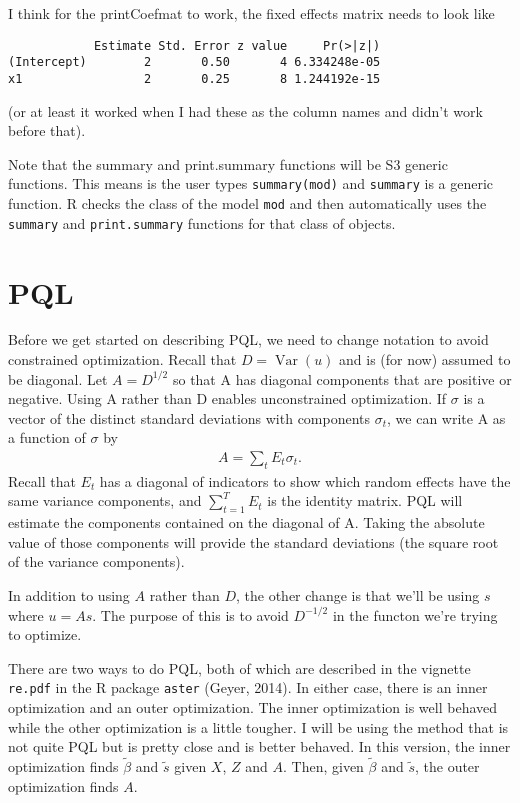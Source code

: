 \documentclass{article}
\DeclareMathOperator{\var}{Var}
\begin{document}
I think for the printCoefmat to work, the fixed effects matrix needs to look like
\begin{verbatim}
            Estimate Std. Error z value     Pr(>|z|)
(Intercept)        2       0.50       4 6.334248e-05
x1                 2       0.25       8 1.244192e-15
\end{verbatim}
(or at least it worked when I had these as the column names and didn't work before that).

Note that the summary and print.summary functions will be S3 generic functions.  This means is the user  types \texttt{summary(mod)} and \texttt{summary} is a generic function. R checks the class of the model \texttt{mod} and then automatically uses the \texttt{summary} and \texttt{print.summary} functions for that class of objects. 




\section{PQL}\label{sec:pql}
 Before we get started on describing PQL, we need to change notation to avoid constrained optimization.  Recall that $D=\var(u)$ and is (for now) assumed to be diagonal. Let $A=D^{1/2}$ so that A has diagonal components that are positive or negative. Using A rather than D enables unconstrained optimization.  If $\sigma$ is a vector of the distinct standard deviations with components $\sigma_t$, we can write A as a function of $\sigma$ by
\begin{align*}
A= \sum_t E_t \sigma_t.
\end{align*}
Recall that $E_t$ has a diagonal of indicators to show which random effects have the same variance components, and $\sum_{t=1}^T E_t$ is the identity matrix. PQL will estimate the components contained on the diagonal of A. Taking the absolute value of those components will provide the standard deviations (the square root of the variance components).

In addition to using $A$ rather than $D$, the other change is that we'll be using $s$ where $u=As$. The purpose of this is to avoid $D^{-1/2}$ in the functon we're trying to optimize.


There are two ways to do PQL, both of which are described in the vignette
 \texttt{re.pdf} in the R package \texttt{aster} (Geyer, 2014). In either case, there is an inner optimization and an outer optimization. The inner optimization is well behaved while the other optimization is a little tougher. I will be using the method that is not quite PQL but is pretty close and is better behaved.  In this version, the inner optimization finds $\tilde{\beta}$ and $\tilde{s}$ given $X$, $Z$ and $A$. Then, given $\tilde{\beta}$ and $\tilde{s}$, the outer optimization finds $A$.
\end{document}
